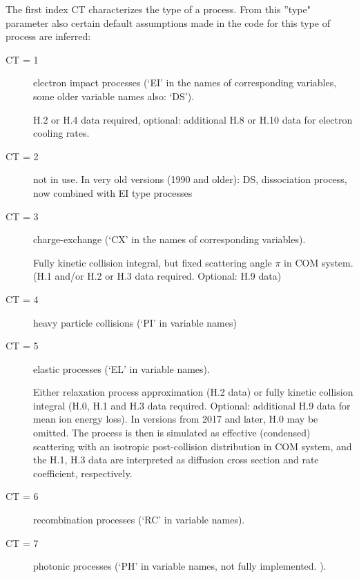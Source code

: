 \medskip

The first index CT characterizes the type of a process.
From this ''type" parameter also certain default assumptions made in the code
for this type of process are inferred:
\begin{description}
  \item[CT = 1] electron impact processes (`EI' in the names of corresponding
        variables, some older variable names also: `DS').

        H.2 or H.4 data required, optional: additional H.8 or H.10 data for electron
        cooling rates.
  \item[CT = 2] not in use.
        In very old versions (1990 and older): DS, dissociation process, now combined
        with EI type processes
  \item[CT = 3] charge-exchange (`CX' in the names of
        corresponding variables).

        Fully kinetic collision integral, but fixed scattering angle $\pi$ in COM
        system.
        (H.1 and/or H.2 or  H.3 data required.
        Optional: H.9 data)
  \item[CT = 4] heavy particle collisions (`PI' in variable
        names)
  \item[CT = 5] elastic processes (`EL' in variable names).

        Either relaxation process approximation (H.2 data) or fully kinetic collision
        integral (H.0, H.1 and H.3 data required.
        Optional: additional  H.9 data for mean ion energy loss).
        In versions from 2017 and later, H.0 may be omitted.
        The process is then is simulated as effective (condensed) scattering with an
        isotropic post-collision distribution in COM system, and the H.1, H.3 data are
        interpreted as diffusion cross section and rate coefficient, respectively.
  \item[CT = 6] recombination processes (`RC' in variable names).

  \item[CT = 7] photonic processes (`PH' in variable names, not fully
        implemented.
        ).
\end{description}

\medskip

